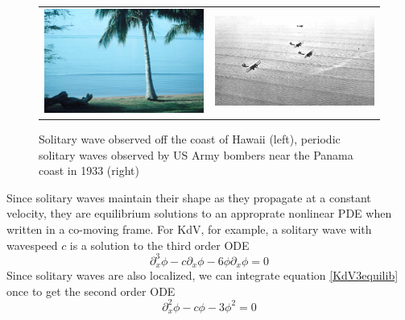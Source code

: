 \documentclass[thesis2.tex]{subfiles}
\begin{document}
\begin{figure}
\begin{center}
\begin{tabular}{cc}
\includegraphics[width=7cm]{images/intro/beach.jpg} &
\includegraphics[width=7cm]{images/intro/cnoidal.jpg}
\end{tabular}
\caption[Solitary waves in nature]{Solitary wave observed off the coast of Hawaii \cite{ANDRIOPOULOS2009} (left), periodic solitary waves observed by US Army bombers near the Panama coast in 1933 (right) }
\label{fig:waterwave}
\end{center}
\end{figure}

Since solitary waves maintain their shape as they propagate at a constant velocity, they are equilibrium solutions to an approprate nonlinear PDE when written in a co-moving frame. For KdV, for example, a solitary wave with wavespeed $c$ is a solution to the third order ODE 
\begin{equation}\label{KdV3equilib}
\partial_x^3 \phi - c \partial_x \phi - 6 \phi \partial_x \phi = 0
\end{equation}
Since solitary waves are also localized, we can integrate equation \cref{KdV3equilib} once to get the second order ODE
\begin{equation}\label{KdV3eq}
\partial_x^2 \phi - c \phi - 3 \phi^2 = 0
\end{equation}
\end{document}
